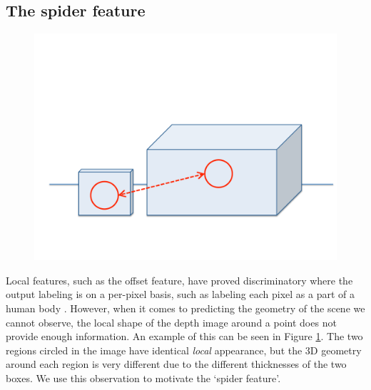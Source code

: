 \documentclass[10pt,twocolumn,letterpaper]{article}
\newcommand{\todo}[1]{\textcolor{red}{TODO: #1}}
\newcommand{\note}[1]{\textcolor{blue}{NOTE: #1}}
\begin{document}
\subsection{The spider feature}

\begin{figure}
  \centering
  \vspace{-15pt}
    \includegraphics[width=0.45\columnwidth]{features_1}
    \vspace{-10pt}
  \caption{}%
    \label{fig:patch_problems}
\end{figure}
Local features, such as the offset feature, have proved discriminatory where the output labeling is on a per-pixel basis, such as labeling each pixel as a part of a human body \cite{shotton-cvpr-2011}.
However, when it comes to predicting the geometry of the scene we cannot observe, the local shape of the depth image around a point does not provide enough information. 
An example of this can be seen in Figure \ref{fig:patch_problems}.
The two regions circled in the image have identical \emph{local} appearance, but the 3D geometry around each region is very different due to the different thicknesses of the two boxes.
We use this observation to motivate the `spider feature'.

\end{document}
